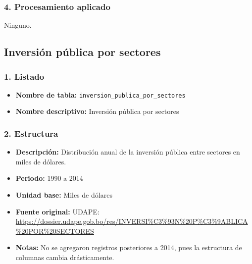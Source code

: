 \documentclass[12pt,a4paper]{article}
\begin{document}
\subsubsection*{4. Procesamiento aplicado}
Ninguno.

\subsection{Inversión pública por sectores}

\subsubsection*{1. Listado}
\begin{itemize}
  \item \textbf{Nombre de tabla:} \texttt{inversion\_publica\_por\_sectores}
  \item \textbf{Nombre descriptivo:} Inversión pública por sectores
\end{itemize}

\subsubsection*{2. Estructura}
\begin{itemize}
  \item \textbf{Descripción:} Distribución anual de la inversión pública entre sectores en miles de dólares.
  \item \textbf{Periodo:} 1990 a 2014
  \item \textbf{Unidad base:} Miles de dólares
  \item \textbf{Fuente original:} UDAPE:\\
    \url{https://dossier.udape.gob.bo/res/INVERSI%C3%93N%20P%C3%9ABLICA%20POR%20SECTORES}
  \item \textbf{Notas:} No se agregaron registros posteriores a 2014, pues la estructura de columnas cambia drásticamente.
\end{itemize}
\end{document}
